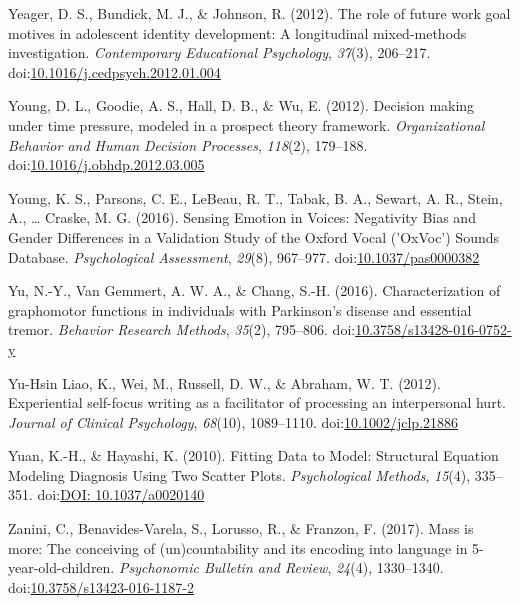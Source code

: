 \documentclass[english,man]{apa6}
\begin{document}
\hypertarget{ref-Yeager2012}{}
Yeager, D. S., Bundick, M. J., \& Johnson, R. (2012). The role of future
work goal motives in adolescent identity development: A longitudinal
mixed-methods investigation. \emph{Contemporary Educational Psychology},
\emph{37}(3), 206--217.
doi:\href{https://doi.org/10.1016/j.cedpsych.2012.01.004}{10.1016/j.cedpsych.2012.01.004}

\hypertarget{ref-Young2012}{}
Young, D. L., Goodie, A. S., Hall, D. B., \& Wu, E. (2012). Decision
making under time pressure, modeled in a prospect theory framework.
\emph{Organizational Behavior and Human Decision Processes},
\emph{118}(2), 179--188.
doi:\href{https://doi.org/10.1016/j.obhdp.2012.03.005}{10.1016/j.obhdp.2012.03.005}

\hypertarget{ref-Young2016}{}
Young, K. S., Parsons, C. E., LeBeau, R. T., Tabak, B. A., Sewart, A.
R., Stein, A., \ldots{} Craske, M. G. (2016). Sensing Emotion in Voices:
Negativity Bias and Gender Differences in a Validation Study of the
Oxford Vocal ('OxVoc') Sounds Database. \emph{Psychological Assessment},
\emph{29}(8), 967--977.
doi:\href{https://doi.org/10.1037/pas0000382}{10.1037/pas0000382}

\hypertarget{ref-Yu2016}{}
Yu, N.-Y., Van Gemmert, A. W. A., \& Chang, S.-H. (2016).
Characterization of graphomotor functions in individuals with
Parkinson's disease and essential tremor. \emph{Behavior Research
Methods}, \emph{35}(2), 795--806.
doi:\href{https://doi.org/10.3758/s13428-016-0752-y}{10.3758/s13428-016-0752-y}

\hypertarget{ref-Yu-HsinLiao2012}{}
Yu-Hsin Liao, K., Wei, M., Russell, D. W., \& Abraham, W. T. (2012).
Experiential self-focus writing as a facilitator of processing an
interpersonal hurt. \emph{Journal of Clinical Psychology},
\emph{68}(10), 1089--1110.
doi:\href{https://doi.org/10.1002/jclp.21886}{10.1002/jclp.21886}

\hypertarget{ref-Yuan2010}{}
Yuan, K.-H., \& Hayashi, K. (2010). Fitting Data to Model: Structural
Equation Modeling Diagnosis Using Two Scatter Plots. \emph{Psychological
Methods}, \emph{15}(4), 335--351.
doi:\href{https://doi.org/DOI:\%2010.1037/a0020140}{DOI: 10.1037/a0020140}

\hypertarget{ref-Zanini2016}{}
Zanini, C., Benavides-Varela, S., Lorusso, R., \& Franzon, F. (2017).
Mass is more: The conceiving of (un)countability and its encoding into
language in 5-year-old-children. \emph{Psychonomic Bulletin and Review},
\emph{24}(4), 1330--1340.
doi:\href{https://doi.org/10.3758/s13423-016-1187-2}{10.3758/s13423-016-1187-2}
\end{document}
